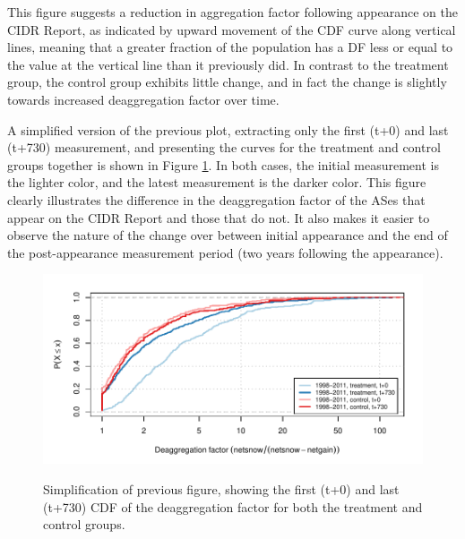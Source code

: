 This figure suggests a reduction in aggregation factor following appearance on
the CIDR Report, as indicated by upward movement of the CDF curve along
vertical lines, meaning that a greater fraction of the population has a DF less
or equal to the value at the vertical line than it previously did. In contrast
to the treatment group, the control group exhibits little change, and in fact
the change is slightly towards increased deaggregation factor over time.

A simplified version of the previous plot, extracting only the first (t+0) and
last (t+730) measurement, and presenting the curves for the treatment and
control groups together is shown in Figure \ref{fig:deagg_factor_cdf_simple}. In
both cases, the initial measurement is the lighter color, and the latest
measurement is the darker color. This figure clearly illustrates the difference
in the deaggregation factor of the ASes that appear on the CIDR Report and
those that do not. It also makes it easier to observe the nature of the change
over between initial appearance and the end of the post-appearance measurement
period (two years following the appearance).

\begin{figure}[H]
\begin{centering}
\begin{singlespace}
    \includegraphics[width=6in]
        {figures/behavior-deagg_factor-1997_2011-special_tc.pdf}
    \vspace{-2em}\\
    \caption{Simplification of previous figure, showing the first (t+0) and
    last (t+730) CDF of the deaggregation factor for both the treatment and
    control groups.}
    \label{fig:deagg_factor_cdf_simple}
\end{singlespace}
\end{centering}
\end{figure}


